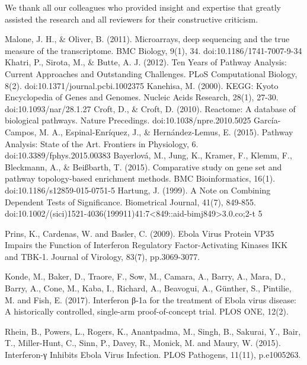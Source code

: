 \documentclass[twocolumn]{article}
\begin{document}
We thank all our colleagues who provided insight and expertise that greatly assisted the research and all reviewers for their constructive criticism. \newpage 


\begin{thebibliography}{9}
	 
	Malone, J. H., \& Oliver, B. (2011). Microarrays, deep sequencing and the true measure of the transcriptome. BMC Biology, 9(1), 34. doi:10.1186/1741-7007-9-34
	Khatri, P., Sirota, M., \& Butte, A. J. (2012). Ten Years of Pathway Analysis: Current Approaches and Outstanding Challenges. PLoS Computational Biology, 8(2). doi:10.1371/journal.pcbi.1002375
	Kanehisa, M. (2000). KEGG: Kyoto Encyclopedia of Genes and Genomes. Nucleic Acids Research, 28(1), 27-30. doi:10.1093/nar/28.1.27
	Croft, D., \& Croft, D. (2010). Reactome: A database of biological pathways. Nature Precedings. doi:10.1038/npre.2010.5025
	García-Campos, M. A., Espinal-Enríquez, J., \& Hernández-Lemus, E. (2015). Pathway Analysis: State of the Art. Frontiers in Physiology, 6. doi:10.3389/fphys.2015.00383 
	Bayerlová, M., Jung, K., Kramer, F., Klemm, F., Bleckmann, A., \& Beißbarth, T. (2015). Comparative study on gene set and pathway topology-based enrichment methods. BMC Bioinformatics, 16(1). doi:10.1186/s12859-015-0751-5   
	Hartung, J. (1999). A Note on Combining Dependent Tests of Significance. Biometrical Journal, 41(7), 849-855. doi:10.1002/(sici)1521-4036(199911)41:7<849::aid-bimj849>3.0.co;2-t 5 
	
	Prins, K., Cardenas, W. and Basler, C. (2009). Ebola Virus Protein VP35 Impairs the Function of Interferon Regulatory Factor-Activating Kinases IKK and TBK-1. Journal of Virology, 83(7), pp.3069-3077.
	
	Konde, M., Baker, D., Traore, F., Sow, M., Camara, A., Barry, A., Mara, D., Barry, A., Cone, M., Kaba, I., Richard, A., Beavogui, A., Günther, S., Pintilie, M. and Fish, E. (2017). Interferon β-1a for the treatment of Ebola virus disease: A historically controlled, single-arm proof-of-concept trial. PLOS ONE, 12(2).
	
	Rhein, B., Powers, L., Rogers, K., Anantpadma, M., Singh, B., Sakurai, Y., Bair, T., Miller-Hunt, C., Sinn, P., Davey, R., Monick, M. and Maury, W. (2015). Interferon-γ Inhibits Ebola Virus Infection. PLOS Pathogens, 11(11), p.e1005263.
	

\end{thebibliography}
\end{document}
